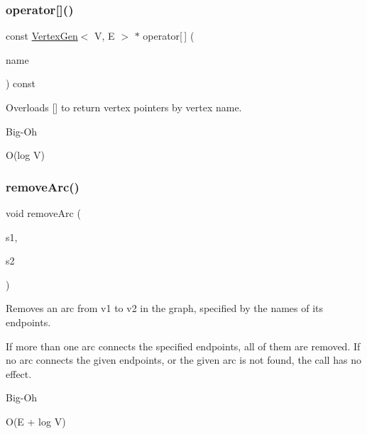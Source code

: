 \subsubsection{\texorpdfstring{operator[]()}{operator[]()}\hspace{0.1cm}{\footnotesize\ttfamily [2/2]}}
{\footnotesize\ttfamily const \mbox{\hyperlink{classVertexGen}{Vertex\+Gen}}$<$ V, E $>$ $\ast$ operator\mbox{[}$\,$\mbox{]} (\begin{DoxyParamCaption}\item[{const std\+::string \&}]{name }\end{DoxyParamCaption}) const}



Overloads {\ttfamily \mbox{[}\mbox{]}} to return vertex pointers by vertex name. 

\begin{DoxyRefDesc}{Big-\/\+Oh}
\item[\mbox{\hyperlink{BigOh__BigOh000039}{Big-\/\+Oh}}]O(log V) \end{DoxyRefDesc}
\mbox{\label{classGraph_af6370fb52d2dab4eb7795da22c33dd02}} 
\subsubsection{\texorpdfstring{remove\+Arc()}{removeArc()}\hspace{0.1cm}{\footnotesize\ttfamily [1/3]}}
{\footnotesize\ttfamily void remove\+Arc (\begin{DoxyParamCaption}\item[{const std\+::string \&}]{s1,  }\item[{const std\+::string \&}]{s2 }\end{DoxyParamCaption})\hspace{0.3cm}{\ttfamily [inherited]}}



Removes an arc from v1 to v2 in the graph, specified by the names of its endpoints. 

If more than one arc connects the specified endpoints, all of them are removed. If no arc connects the given endpoints, or the given arc is not found, the call has no effect. \begin{DoxyRefDesc}{Big-\/\+Oh}
\item[\mbox{\hyperlink{BigOh__BigOh000084}{Big-\/\+Oh}}]O(E + log V) \end{DoxyRefDesc}
\mbox{\label{classGraph_ae0c9f44b20b49ffae9fecc0a4f156ac1}} 
